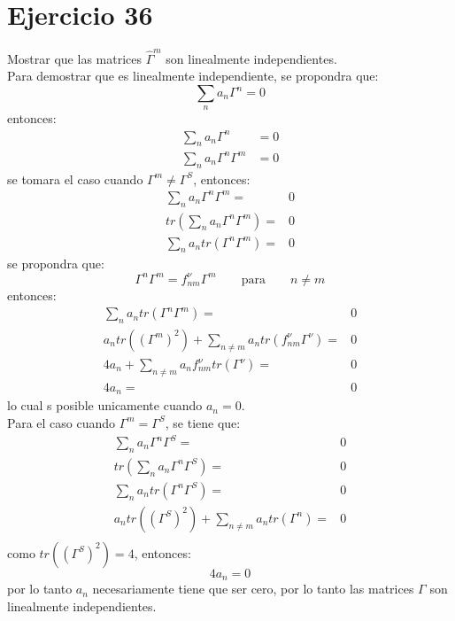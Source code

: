 \section*{Ejercicio 36}
Mostrar que las matrices $\hat{\Gamma}^m$ son linealmente independientes.\\
Para demostrar que es linealmente independiente, se propondra que:
\begin{equation*}
    \sum_n a_n \Gamma^n = 0
\end{equation*}
entonces:
\begin{align*}
    \sum_n a_n \Gamma^n &= 0\\
    \sum_n a_n \Gamma^n \Gamma^m &=0
\end{align*}
se tomara el caso cuando $\Gamma^m \neq \Gamma^S$, entonces:
\begin{align*}
    \sum_n a_n \Gamma^n \Gamma^m =&0 \\
    tr\left( \sum_n a_n \Gamma^n \Gamma^m\right)=&0 \\
    \sum_n a_n tr\left(\Gamma^n \Gamma^m\right) =&0
\end{align*}
se propondra que:
\begin{equation*}
    \Gamma^n \Gamma^m = f_{nm}^\nu \Gamma^m\qquad  \text{para} \qquad n\neq m
\end{equation*}
entonces:
\begin{align*}
    \sum_n a_n tr\left(\Gamma^n \Gamma^m\right) =&0 \\
    a_n tr\left(\left(\Gamma^m\right)^2\right) + \sum_{n\neq m} a_n  tr\left(f_{nm}^\nu\Gamma^\nu\right)=&0 \\
     4a_n +  \sum_{n\neq m} a_n f_{nm}^\nu tr\left(\Gamma^\nu\right)=&0 \\
    4a_n =& 0 
\end{align*}
lo cual s posible unicamente cuando $a_n=0$.\\
Para el caso cuando $\Gamma^m=\Gamma^S$, se tiene que:
\begin{align*}
    \sum_n a_n \Gamma^n \Gamma^S =&0 \\
    tr\left( \sum_n a_n \Gamma^n \Gamma^S\right)=&0 \\
    \sum_n a_n tr\left(\Gamma^n \Gamma^S\right) =&0\\
    a_n tr\left(\left(\Gamma^S\right)^2\right) + \sum_{n\neq m} a_n tr\left(\Gamma^n\right) =&0\\
\end{align*}
como $tr\left(\left(\Gamma^S\right)^2\right)=4$, entonces:
\begin{equation*}
    4a_n =0
\end{equation*}
por lo tanto $a_n$ necesariamente tiene que ser cero, por lo tanto las matrices $\Gamma$ son linealmente independientes.
